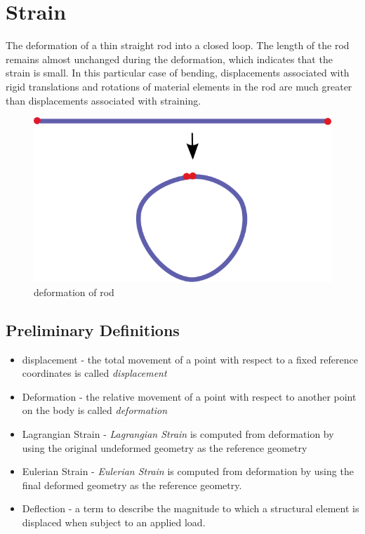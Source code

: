 
\chapter{Strain}

The deformation of a thin straight rod into a closed loop. The length of the rod remains almost unchanged during the deformation, which indicates that the strain is small. In this particular case of bending, displacements associated with rigid translations and rotations of material elements in the rod are much greater than displacements associated with straining.

\begin{figure}[h]
	\centering
	\includegraphics[width=0.7\linewidth]{figure/DeformationOfRod.png}
	\caption{deformation of rod}
	\label{fig:DeformationOfRod}
\end{figure}

\section{Preliminary Definitions}
\begin{itemize}
	\item displacement - the total movement of a point with respect to a fixed reference coordinates is called \textit{displacement}
	\item Deformation - the relative movement of a point with respect to another point on the body is called \textit{deformation}
	\item Lagrangian Strain - \textit{Lagrangian Strain} is computed from deformation by using the original undeformed geometry as the reference geometry
	\item Eulerian Strain - \textit{Eulerian Strain} is computed from deformation by using the final deformed geometry as the reference geometry.
	\item Deflection - a term to describe the magnitude to which a structural element is displaced when subject to an applied load.
\end{itemize}

